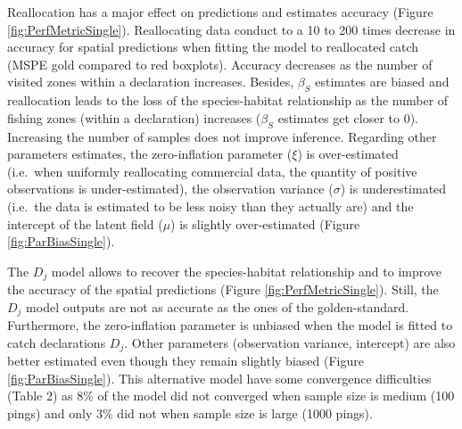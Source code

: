 \documentclass[
  english,
  man,floatsintext]{apa6}
\begin{document}
Reallocation has a major effect on predictions and estimates accuracy (Figure \ref{fig:PerfMetricSingle}). Reallocating data conduct to a 10 to 200 times decrease in accuracy for spatial predictions when fitting the model to reallocated catch (MSPE gold compared to red boxplots). Accuracy decreases as the number of visited zones within a declaration increases. Besides, \(\beta_S\) estimates are biased and reallocation leads to the loss of the species-habitat relationship as the number of fishing zones (within a declaration) increases (\(\beta_S\) estimates get closer to 0). Increasing the number of samples does not improve inference. Regarding other parameters estimates, the zero-inflation parameter (\(\xi\)) is over-estimated (i.e.~when uniformly reallocating commercial data, the quantity of positive observations is under-estimated), the observation variance (\(\sigma\)) is underestimated (i.e.~the data is estimated to be less noisy than they actually are) and the intercept of the latent field (\(\mu\)) is slightly over-estimated (Figure \ref{fig:ParBiasSingle}).

The \(D_j\) model allows to recover the species-habitat relationship and to improve the accuracy of the spatial predictions (Figure \ref{fig:PerfMetricSingle}). Still, the \(D_j\) model outputs are not as accurate as the ones of the golden-standard. Furthermore, the zero-inflation parameter is unbiased when the model is fitted to catch declarations \(D_j\). Other parameters (observation variance, intercept) are also better estimated even though they remain slightly biased (Figure \ref{fig:ParBiasSingle}). This alternative model have some convergence difficulties (Table 2) as 8\% of the model did not converged when sample size is medium (100 pings) and only 3\% did not when sample size is large (1000 pings).
\end{document}
